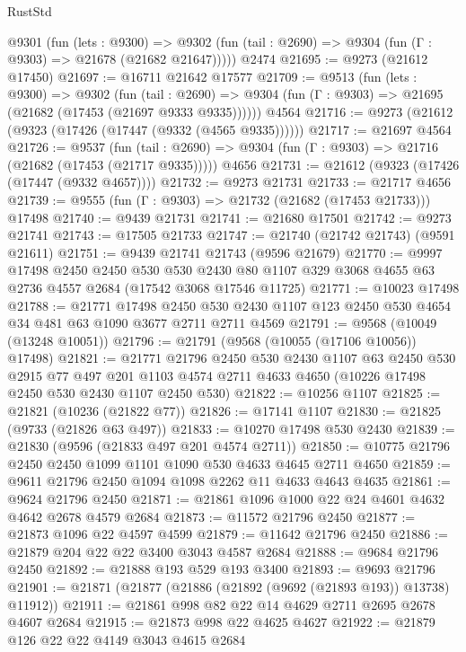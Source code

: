 \begin{lexlean}{RustStd}
\begin{coremodule}
    @9301
      (fun (lets : @9300) =>
      @9302 (fun (tail : @2690) => @9304 (fun (Γ : @9303) => @21678 (@21682 @21647)))))
    @2474
@21695 := @9273 (@21612 @17450)
@21697 := @16711 @21642 @17577
@21709 := @9513
    (fun (lets : @9300) =>
    @9302
      (fun (tail : @2690) =>
      @9304 (fun (Γ : @9303) => @21695 (@21682 (@17453 (@21697 @9333 @9335))))))
    @4564
@21716 := @9273 (@21612 (@9323 (@17426 (@17447 (@9332 (@4565 @9335))))))
@21717 := @21697 @4564
@21726 := @9537
    (fun (tail : @2690) => @9304 (fun (Γ : @9303) => @21716 (@21682 (@17453 (@21717 @9335)))))
    @4656
@21731 := @21612 (@9323 (@17426 (@17447 (@9332 @4657))))
@21732 := @9273 @21731
@21733 := @21717 @4656
@21739 := @9555 (fun (Γ : @9303) => @21732 (@21682 (@17453 @21733))) @17498
@21740 := @9439 @21731
@21741 := @21680 @17501
@21742 := @9273 @21741
@21743 := @17505 @21733
@21747 := @21740 (@21742 @21743) (@9591 @21611)
@21751 := @9439 @21741 @21743 (@9596 @21679)
@21770 := @9997
    @17498
    @2450
    @2450
    @530
    @530
    @2430
    @80
    @1107
    @329
    @3068
    @4655
    @63
    @2736
    @4557
    @2684
    (@17542 @3068 @17546 @11725)
@21771 := @10023 @17498
@21788 := @21771
    @17498
    @2450
    @530
    @2430
    @1107
    @123
    @2450
    @530
    @4654
    @34
    @481
    @63
    @1090
    @3677
    @2711
    @2711
    @4569
@21791 := @9568 (@10049 (@13248 @10051))
@21796 := @21791 (@9568 (@10055 (@17106 @10056)) @17498)
@21821 := @21771
    @21796
    @2450
    @530
    @2430
    @1107
    @63
    @2450
    @530
    @2915
    @77
    @497
    @201
    @1103
    @4574
    @2711
    @4633
    @4650
    (@10226 @17498 @2450 @530 @2430 @1107 @2450 @530)
@21822 := @10256 @1107
@21825 := @21821 (@10236 (@21822 @77))
@21826 := @17141 @1107
@21830 := @21825 (@9733 (@21826 @63 @497))
@21833 := @10270 @17498 @530 @2430
@21839 := @21830 (@9596 (@21833 @497 @201 @4574 @2711))
@21850 := @10775 @21796 @2450 @2450 @1099 @1101 @1090 @530 @4633 @4645 @2711 @4650
@21859 := @9611 @21796 @2450 @1094 @1098 @2262 @11 @4633 @4643 @4635
@21861 := @9624 @21796 @2450
@21871 := @21861 @1096 @1000 @22 @24 @4601 @4632 @4642 @2678 @4579 @2684
@21873 := @11572 @21796 @2450
@21877 := @21873 @1096 @22 @4597 @4599
@21879 := @11642 @21796 @2450
@21886 := @21879 @204 @22 @22 @3400 @3043 @4587 @2684
@21888 := @9684 @21796 @2450
@21892 := @21888 @193 @529 @193 @3400
@21893 := @9693 @21796
@21901 := @21871 (@21877 (@21886 (@21892 (@9692 (@21893 @193)) @13738) @11912))
@21911 := @21861 @998 @82 @22 @14 @4629 @2711 @2695 @2678 @4607 @2684
@21915 := @21873 @998 @22 @4625 @4627
@21922 := @21879 @126 @22 @22 @4149 @3043 @4615 @2684

\end{coremodule}
\end{lexlean}
